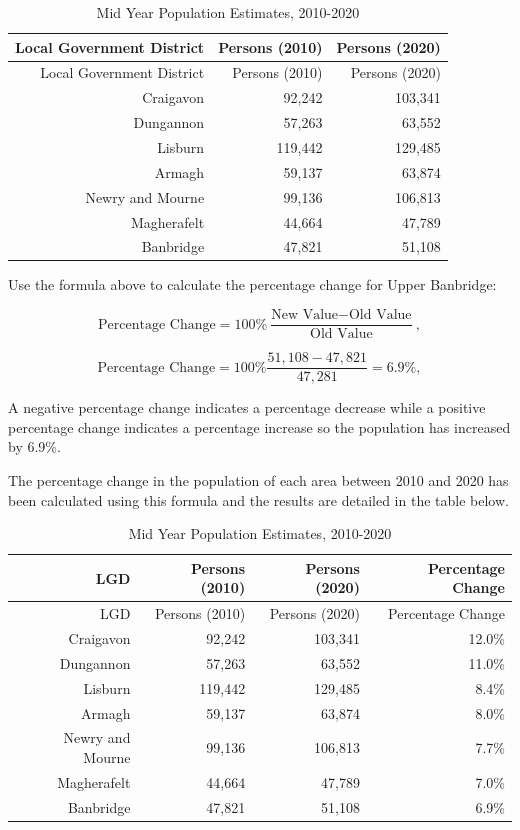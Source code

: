 \documentclass[
]{book}
\begin{document}
\begin{longtable}[]{@{}rrr@{}}
\caption{\label{tab:table10} Mid Year Population Estimates, 2010-2020}\tabularnewline
\toprule
Local Government District & Persons (2010) & Persons (2020) \\
\midrule
\endfirsthead
\toprule
Local Government District & Persons (2010) & Persons (2020) \\
\midrule
\endhead
Craigavon & 92,242 & 103,341 \\
Dungannon & 57,263 & 63,552 \\
Lisburn & 119,442 & 129,485 \\
Armagh & 59,137 & 63,874 \\
Newry and Mourne & 99,136 & 106,813 \\
Magherafelt & 44,664 & 47,789 \\
Banbridge & 47,821 & 51,108 \\
\bottomrule
\end{longtable}

Use the formula above to calculate the percentage change for Upper Banbridge:

\[ \textrm{Percentage Change} = 100\% \frac{\textrm{New Value} - \textrm{Old Value}}{\textrm{Old Value}},\]

\[ \textrm{Percentage Change} = 100\% \frac{51,108-47,821}{47,281}=6.9\%,\]

A negative percentage change indicates a percentage decrease while a positive percentage change indicates a percentage increase so the population has increased by 6.9\%.

The percentage change in the population of each area between 2010 and 2020 has been calculated using this formula and the results are detailed in the table below.

\begin{longtable}[]{@{}rrrr@{}}
\caption{\label{tab:table1023} Mid Year Population Estimates, 2010-2020}\tabularnewline
\toprule
LGD & Persons (2010) & Persons (2020) & Percentage Change \\
\midrule
\endfirsthead
\toprule
LGD & Persons (2010) & Persons (2020) & Percentage Change \\
\midrule
\endhead
Craigavon & 92,242 & 103,341 & 12.0\% \\
Dungannon & 57,263 & 63,552 & 11.0\% \\
Lisburn & 119,442 & 129,485 & 8.4\% \\
Armagh & 59,137 & 63,874 & 8.0\% \\
Newry and Mourne & 99,136 & 106,813 & 7.7\% \\
Magherafelt & 44,664 & 47,789 & 7.0\% \\
Banbridge & 47,821 & 51,108 & 6.9\% \\
\bottomrule
\end{longtable}
\end{document}
